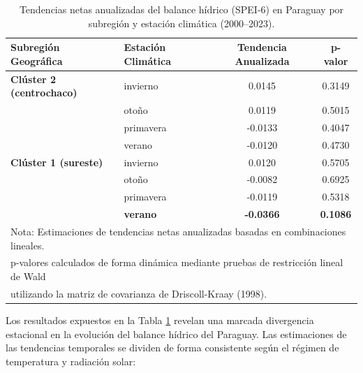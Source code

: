 \begin{table}[ht!]
\centering
\caption{Tendencias netas anualizadas del balance hídrico (SPEI-6) en Paraguay por subregión y estación climática (2000--2023).}
\label{tab:pendientes_netas}
\vspace{-0.6cm} 
\singlespacing %
\small         %
\begin{tabular}{llcc}
\hline\hline
\textbf{Subregión Geográfica} & \textbf{Estación Climática} & \textbf{Tendencia Anualizada} & \textbf{p-valor} \\ \hline
\textbf{Clúster 2 (centrochaco)} & invierno & 0.0145 & 0.3149 \\
                                 & otoño & 0.0119 & 0.5015 \\
                                 & primavera & -0.0133 & 0.4047 \\
                                 & verano & -0.0120 & 0.4730 \\ \hline
\textbf{Clúster 1 (sureste)}    & invierno & 0.0120 & 0.5705 \\
                                 & otoño & -0.0082 & 0.6925 \\
                                 & primavera & -0.0119 & 0.5318 \\
                                 & \textbf{verano} & \textbf{-0.0366} & \textbf{0.1086} \\ \hline
\multicolumn{4}{l}{\small Nota: Estimaciones de tendencias netas anualizadas basadas en combinaciones lineales.} \\
\multicolumn{4}{l}{\small p-valores calculados de forma dinámica mediante pruebas de restricción lineal de Wald} \\
\multicolumn{4}{l}{\small utilizando la matriz de covarianza de Driscoll-Kraay (1998).} \\
\hline\hline
\end{tabular}
\end{table}

Los resultados expuestos en la Tabla \ref{tab:pendientes_netas} revelan una marcada divergencia estacional en la evolución del balance hídrico del Paraguay. Las estimaciones de las tendencias temporales se dividen de forma consistente según el régimen de temperatura y radiación solar:

